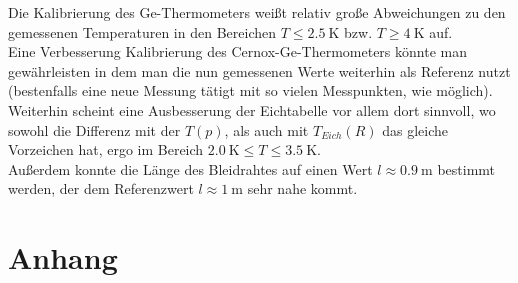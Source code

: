 \documentclass[german,  %
parskip=full,  %
headsepline]{scrartcl}
\begin{document}
Die  Kalibrierung des Ge-Thermometers weißt relativ große Abweichungen zu den gemessenen Temperaturen in den Bereichen $T \le \SI{2.5}{\kelvin}$ bzw. $T \ge  \SI{4}{\kelvin}$ auf.\\
Eine Verbesserung Kalibrierung des Cernox-Ge-Thermometers könnte man gewährleisten in dem man die nun gemessenen Werte weiterhin als Referenz nutzt (bestenfalls eine neue Messung tätigt mit so vielen Messpunkten, wie möglich).\\
Weiterhin scheint eine Ausbesserung der Eichtabelle vor allem dort sinnvoll, wo sowohl die Differenz mit der $T(p)$, als auch mit $T_{Eich}(R)$ das gleiche Vorzeichen hat, ergo im Bereich $\SI{2.0}{\kelvin} \le T \le \SI{3.5}{\kelvin}$.\\
Außerdem konnte die Länge des Bleidrahtes auf einen Wert $l \approx \SI{0.9}{\meter}$ bestimmt werden, der dem Referenzwert $l \approx \SI{1}{\meter}$ sehr nahe kommt.
\setcounter{biburllcpenalty}{7000}
\setcounter{biburlucpenalty}{8000}
\printbibliography
\pagebreak
\section{Anhang}
\end{document}
